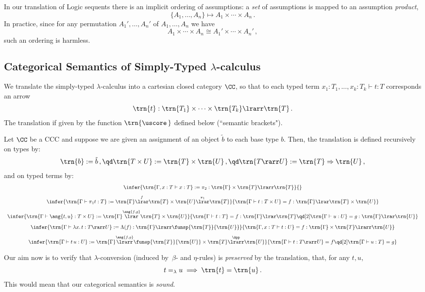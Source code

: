 \documentclass[12pt]{article}
\begin{document}
\begin{myremark}
In our translation of Logic sequents there is an implicit ordering of assumptions: a \emph{set} of assumptions is mapped to an assumption \emph{product},
\[ \{A_1,\dots,A_n\} \longmapsto A_1\times\cdots\times A_n\,. \]
In practice, since for any permutation $A_1',\dots,A_n'$ of $A_1,\dots,A_n$ we have
\[ A_1\times\cdots\times A_n \cong A_1'\times\cdots\times A_n'\,,\]
such an ordering is harmless.
\end{myremark}

\subsection{Categorical Semantics of Simply-Typed $\lambda$-calculus}

We translate the simply-typed $\lambda$-calculus into a cartesian closed category $\CC$, so that to each typed term $x_1:T_1,...,x_k:T_k\vdash t:T$
corresponds an arrow
\[ \trn{t}:\trn{T_1}\times\cdots\times\trn{T_k}\lrarr\trn{T}\,. \]
The translation if given by the function $\trn{\uscore\,}$ defined below (``semantic brackets").

\begin{mydefinition}\label{d:SemTr}
Let $\CC$ be a CCC and suppose we are given an assignment of an object $\tilde{b}$ to each base type $b$. Then, the translation is defined recursively
on types by:
\[ \trn{b}:=\tilde{b} \,,\qd \trn{T\times U}:=\trn{T}\times\trn{U} \,,\qd \trn{T\rarr U}:=\trn{T}\Rightarrow\trn{U}\,, \]
and on typed terms by:
\[\begin{array}{c}
\infer{\trn{\Gamma,x:T\vdash x:T} := \pi_2:\trn{\Gamma}\times\trn{T}\lrarr\trn{T}}{}
\\[3mm]
\infer{\trn{\Gamma\vdash\pi_1 t:T}:=\trn{\Gamma}\overset{f}{\lrar}\trn{T}\times\trn{U}\overset{\pi_1}{\lrar}\trn{T}}{%
    \trn{\Gamma\vdash t:T\times U}=f:\trn{\Gamma}\lrar\trn{T}\times\trn{U}}
\\[3mm]
\infer{\trn{\Gamma\vdash \ang{t,u}:T\times U}:=\trn{\Gamma}\overset{\ang{f,g}}{\lrar}\trn{T}\times\trn{U}}{%
    \trn{\Gamma\vdash t:T}=f:\trn{\Gamma}\lrar\trn{T}\qd[2]\trn{\Gamma\vdash u:U}=g:\trn{\Gamma}\lrar\trn{U}}
\\[3mm]
\infer{\trn{\Gamma\vdash\lambda x.\,t:T\rarr U}:=\Lambda(f):\trn{\Gamma}\lrarr\funsp{\trn{T}}{\trn{U}}}{%
    \trn{\Gamma,x:T\vdash t:U}=f:\trn{\Gamma}\times\trn{T}\lrarr\trn{U}}
\\[3mm]
\infer{\trn{\Gamma\vdash t\,u: U}:=\trn{\Gamma}\overset{\ang{f,g}}{\lrarr}\funsp{\trn{T}}{\trn{U}}\times\trn{T}
    \overset{\App}{\lrarr}\trn{U}}{%
        \trn{\Gamma\vdash t:T\rarr U}=f\qd[2]\trn{\Gamma\vdash u:T}=g}
\end{array}\]\deq[-1]
\end{mydefinition}
%
Our aim now is to verify that $\lambda$-conversion (induced by~$\beta$- and $\eta$-rules) is \emph{preserved} by the translation, \ie that, for any
$t,u$,
\[ t=_\lambda u \implies \trn{t}=\trn{u}\,. \]
This would mean that our categorical semantics is \emph{sound}.
\end{document}
